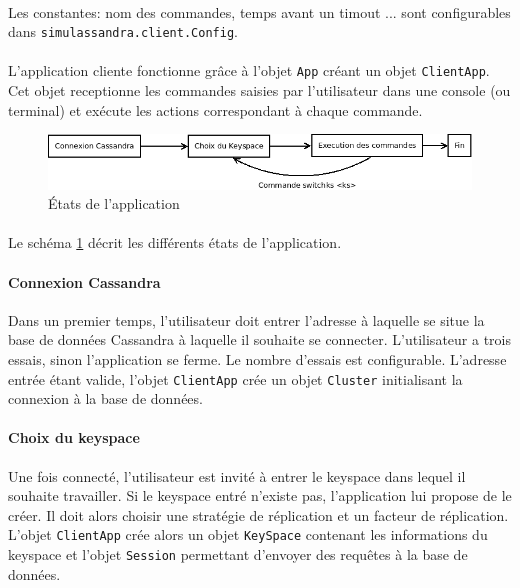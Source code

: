 \documentclass[12pt]{article}
\newcommand{\class}[1]{\texttt{#1}}
\begin{document}
\paragraph{} Les constantes: nom des commandes, temps avant un timout ... sont configurables dans  \class{simulassandra.client.Config}.

\paragraph{}L'application cliente fonctionne grâce à l'objet \class{App} créant un objet \class{ClientApp}.
Cet objet receptionne les commandes saisies par l'utilisateur dans une console (ou terminal) et exécute les actions correspondant à chaque commande.

\begin{figure}[h]
	\centering
		\includegraphics[width=13cm]{images/client/vie.png}
	\caption{États de l'application \label{fig:vie}}
\end{figure}

\paragraph{} Le schéma \ref{fig:vie} décrit les différents états de l'application.

\paragraph{Connexion Cassandra} Dans un premier temps, l'utilisateur doit entrer l'adresse à laquelle se situe la base de données Cassandra à laquelle il souhaite se connecter.
L'utilisateur a trois essais, sinon l'application se ferme. Le nombre d'essais est configurable. L'adresse entrée étant valide, 
l'objet \class{ClientApp} crée un objet \class{Cluster} initialisant la connexion à la base de données.

\paragraph{Choix du keyspace} Une fois connecté, l'utilisateur est invité à entrer le keyspace dans lequel il souhaite travailler. Si le keyspace entré n'existe pas, l'application
lui propose de le créer. Il doit alors choisir une stratégie de réplication et un facteur de réplication.
L'objet \class{ClientApp} crée alors un objet \class{KeySpace} contenant les informations du keyspace et l'objet \class{Session} permettant d'envoyer des requêtes à la base de données.
\end{document}
